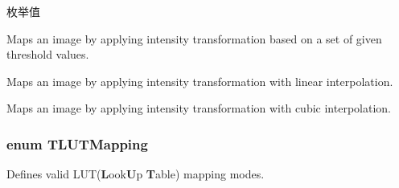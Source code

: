 \begin{Desc}
\item[枚举值]\par
\begin{description}
\item[{\em 
\hypertarget{group___common_interface_gga40d5450344b3aaaf127544ef3985cfbbab270cac40a897cf1ad142f192f4bcc85}{L\+U\+Tim\+Threshold}\label{group___common_interface_gga40d5450344b3aaaf127544ef3985cfbbab270cac40a897cf1ad142f192f4bcc85}
}]Maps an image by applying intensity transformation based on a set of given threshold values. \item[{\em 
\hypertarget{group___common_interface_gga40d5450344b3aaaf127544ef3985cfbbae321531249291aa722d209310d088430}{L\+U\+Tim\+Linear}\label{group___common_interface_gga40d5450344b3aaaf127544ef3985cfbbae321531249291aa722d209310d088430}
}]Maps an image by applying intensity transformation with linear interpolation. \item[{\em 
\hypertarget{group___common_interface_gga40d5450344b3aaaf127544ef3985cfbba5a37c0ceccef5667d8a3d6c91a514717}{L\+U\+Tim\+Cubic}\label{group___common_interface_gga40d5450344b3aaaf127544ef3985cfbba5a37c0ceccef5667d8a3d6c91a514717}
}]Maps an image by applying intensity transformation with cubic interpolation. \end{description}
\end{Desc}
\hypertarget{group___common_interface_ga161dbf21975385f4cd6bd555fd39298c}{
\subsubsection[{T\+L\+U\+T\+Mapping}]{\setlength{\rightskip}{0pt plus 5cm}enum {\bf T\+L\+U\+T\+Mapping}}}\label{group___common_interface_ga161dbf21975385f4cd6bd555fd39298c}


Defines valid L\+U\+T({\bfseries L}ook{\bfseries U}p {\bfseries T}able) mapping modes. 

